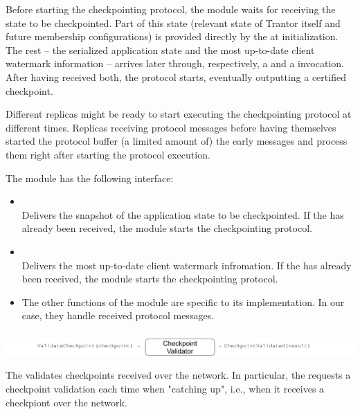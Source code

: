 \documentclass{article}
\begin{document}
Before starting the checkpointing protocol, the  module waits for receiving the state to be checkpointed.
Part of this state (relevant state of Trantor itself and future membership configurations)
is provided directly by the  at initialization.
The rest -- the serialized application state and the most up-to-date client watermark information --
arrives later through, respectively, a  and a  invocation.
After having received both, the protocol starts, eventually outputting a certified checkpoint.

Different replicas might be ready to start executing the checkpointing protocol at different times.
Replicas receiving protocol messages before having themselves started the protocol buffer (a limited amount of) the early messages
and process them right after starting the protocol execution.

The  module has the following interface:

\begin{itemize}
    \item {}\\
    Delivers the snapshot of the application state to be checkpointed.
    If the  has already been received, the module starts the checkpointing protocol.
    
    \item {}\\
    Delivers the most up-to-date client watermark infromation.
    If the  has already been received, the module starts the checkpointing protocol.

    \item The other functions of the  module are specific to its implementation.
    In our case, they handle received protocol messages.
\end{itemize}

\subsubsection{}

\includegraphics[width=\textwidth]{figures/modules/module-checkpoint-validator.pdf}

The  validates checkpoints received over the network.
In particular, the  requests a checkpoint validation each time when "catching up",
i.e., when it receives a checkpiont over the network.
\end{document}
